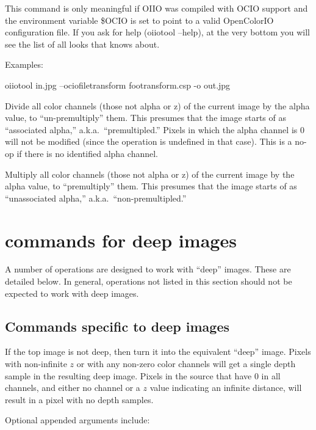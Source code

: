 This command is only meaningful if OIIO was compiled with OCIO support
and the environment variable {\cf \$OCIO} is set to point to a valid
OpenColorIO configuration file.  If you ask for \oiiotool help 
({\cf oiiotool --help}), at the very bottom you will see the list of all
looks that \oiiotool knows about.

\noindent Examples:
\begin{tinycode}
  oiiotool in.jpg --ociofiletransform footransform.csp -o out.jpg
\end{tinycode}

\apiend

Divide all color channels (those not alpha or z) of the current image by
the alpha value, to ``un-premultiply'' them.  This presumes that the
image starts of as ``associated alpha,'' a.k.a.\ ``premultipled.''
Pixels in which the alpha channel is 0 will not be modified (since the
operation is undefined in that case).  This is a no-op if there is no
identified alpha channel.
\apiend

Multiply all color channels (those not alpha or z) of the current image
by the alpha value, to ``premultiply'' them.  This presumes that the
image starts of as ``unassociated alpha,'' a.k.a.\ ``non-premultipled.''
\apiend


\section{\oiiotool commands for deep images}

A number of \oiiotool operations are designed to work with ``deep'' images.
These are detailed below. In general, operations not listed in this section
should not be expected to work with deep images.

\subsection{Commands specific to deep images}

If the top image is not deep, then turn it into the equivalent ``deep''
image. Pixels with non-infinite $z$ or with any non-zero color channels will
get a single depth sample in the resulting deep image. Pixels in the source
that have 0 in all channels, and either no  channel or a $z$ value
indicating an infinite distance, will result in a pixel with no depth
samples.

\noindent Optional appended arguments include:

